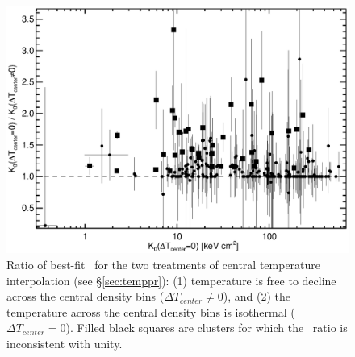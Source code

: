 \clearpage
\begin{figure}[htp]
  \begin{center}
    \begin{minipage}[htp]{0.9\linewidth}
      \includegraphics*[width=\textwidth, trim=5mm 0mm 5mm 5mm, clip]{itplflat_rat.eps}
      \caption{Ratio of best-fit \kna\ for the two treatments of
        central temperature interpolation (see \S\ref{sec:temppr}): (1)
        temperature is free to decline across the central density bins
        ($\Delta T_{center} \ne 0$), and (2) the temperature across the
        central density bins is isothermal ($\Delta T_{center} =
        0$). Filled black squares are clusters for which the \kna\ ratio is
        inconsistent with unity.}
      \label{fig:kcomp}
    \end{minipage}
  \end{center}
\end{figure}


